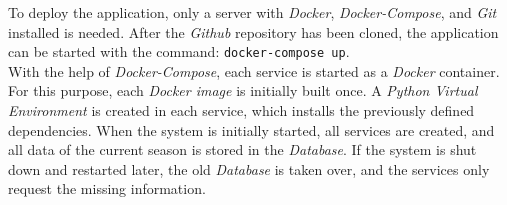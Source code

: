 \clearpage To deploy the application, only a server with \emph{Docker}, \emph{Docker-Compose}, and \emph{Git} installed is needed. After the \emph{Github} repository has been cloned, the application can be started with the command:  \lstinline{docker-compose up}. \\
\indent With the help of \emph{Docker-Compose}, each service is started as a \emph{Docker} container. For this purpose, each \emph{Docker image} is initially built once. A \emph{Python Virtual Environment} is created in each service, which installs the previously defined dependencies. When the system is initially started, all services are created, and all data of the current season is stored in the \emph{Database}. If the system is shut down and restarted later, the old \emph{Database} is taken over, and the services only request the missing information.